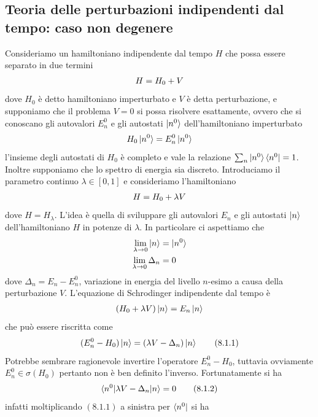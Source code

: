 \documentclass{article}
\begin{document}
\subsection{Teoria delle perturbazioni indipendenti dal tempo: caso non degenere}
Consideriamo un hamiltoniano indipendente dal tempo $H$ che possa essere separato in due termini
\begin{gather}
    H = H_0 + V \notag
\end{gather}
dove $H_0$ è detto hamiltoniano imperturbato e $V$ è detta perturbazione, e supponiamo che il problema $V = 0$ si possa risolvere esattamente, ovvero che si conoscano gli autovalori $E_n^0$ e gli autostati $\ket{n^0}$ dell'hamiltoniano imperturbato
\begin{gather}
    H_0\ket{n^0} = E_n^0\ket{n^0} \notag
\end{gather}
l'insieme degli autostati di $H_0$ è completo e vale la relazione $\sum_n \ket{n^0}\bra{n^0} = 1$. Inoltre supponiamo che lo spettro di energia sia discreto. Introduciamo il parametro continuo $\lambda \in [0, 1]$ e consideriamo l'hamiltoniano
\begin{gather}
    H = H_0 + \lambda V \notag
\end{gather}
dove $H = H_\lambda$. L'idea è quella di sviluppare gli autovalori $E_n$ e gli autostati $\ket{n}$ dell'hamiltoniano $H$ in potenze di $\lambda$. In particolare ci aspettiamo che
\begin{align}
    \lim_{\lambda \rightarrow 0} \ket{n} &= \ket{n^0} \notag \\
    \lim_{\lambda \rightarrow 0} \Delta_n &= 0 \notag
\end{align}
dove $\Delta_n = E_n - E_n^0$, variazione in energia del livello $n$-esimo a causa della perturbazione $V$. L'equazione di Schrodinger indipendente dal tempo è
\begin{gather}
    (H_0 + \lambda V)\ket{n} = E_n\ket{n} \notag
\end{gather}
che può essere riscritta come
\begin{gather}
    (E_n^0 - H_0)\ket{n} = (\lambda V - \Delta_n)\ket{n} \tag{8.1.1}
\end{gather}
Potrebbe sembrare ragionevole invertire l'operatore $E_n^0 - H_0$, tuttavia ovviamente $E_n^0 \in \sigma(H_0)$ pertanto non è ben definito l'inverso. Fortunatamente si ha
\begin{gather}
    \braket{n^0|\lambda V - \Delta_n|n} = 0 \tag{8.1.2}
\end{gather}
infatti moltiplicando $(8.1.1)$ a sinistra per $\bra{n^0}$ si ha
\end{document}
